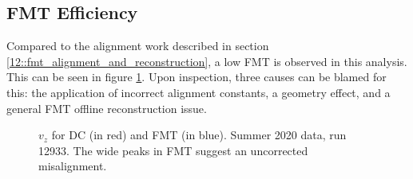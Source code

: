 \subsection{FMT Efficiency}
\label{ssec::fmt_efficiency}
    Compared to the alignment work described in section \ref{12::fmt_alignment_and_reconstruction}, a low FMT is observed in this analysis.
    This can be seen in figure \ref{fig::vz_012933}.
    Upon inspection, three causes can be blamed for this: the application of incorrect alignment constants, a geometry effect, and a general FMT offline reconstruction issue.

    \begin{figure}[b!]
        \centering{}
        \caption[$v_z$ for DC and FMT, run 12933]{$v_z$ for DC (in red) and FMT (in blue). Summer 2020 data, run 12933. The wide peaks in FMT suggest an uncorrected misalignment.}
        \label{fig::vz_012933}
    \end{figure}

    
    
    
    
